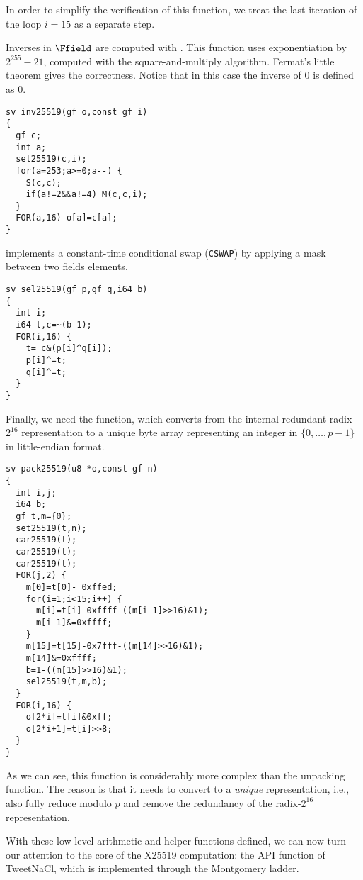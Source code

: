 In order to simplify the verification of this function,
we treat the last iteration of the loop $i = 15$ as a separate step.

Inverses in $\Ffield$ are computed with .
This function uses exponentiation by $2^{255}-21$,
computed with the square-and-multiply algorithm.
Fermat's little theorem gives the correctness.
Notice that in this case the inverse of $0$ is defined as $0$.
\begin{lstlisting}[language=Ctweetnacl]
sv inv25519(gf o,const gf i)
{
  gf c;
  int a;
  set25519(c,i);
  for(a=253;a>=0;a--) {
    S(c,c);
    if(a!=2&&a!=4) M(c,c,i);
  }
  FOR(a,16) o[a]=c[a];
}
\end{lstlisting}

 implements a constant-time conditional swap (\texttt{CSWAP}) by
applying a mask between two fields elements.
\begin{lstlisting}[language=Ctweetnacl]
sv sel25519(gf p,gf q,i64 b)
{
  int i;
  i64 t,c=~(b-1);
  FOR(i,16) {
    t= c&(p[i]^q[i]);
    p[i]^=t;
    q[i]^=t;
  }
}
\end{lstlisting}

Finally, we need the  function,
which converts from the internal redundant radix-$2^{16}$
representation to a unique byte array representing an
integer in $\{0,\dots,p-1\}$ in little-endian format.
\begin{lstlisting}[language=Ctweetnacl]
sv pack25519(u8 *o,const gf n)
{
  int i,j;
  i64 b;
  gf t,m={0};
  set25519(t,n);
  car25519(t);
  car25519(t);
  car25519(t);
  FOR(j,2) {
    m[0]=t[0]- 0xffed;
    for(i=1;i<15;i++) {
      m[i]=t[i]-0xffff-((m[i-1]>>16)&1);
      m[i-1]&=0xffff;
    }
    m[15]=t[15]-0x7fff-((m[14]>>16)&1);
    m[14]&=0xffff;
    b=1-((m[15]>>16)&1);
    sel25519(t,m,b);
  }
  FOR(i,16) {
    o[2*i]=t[i]&0xff;
    o[2*i+1]=t[i]>>8;
  }
}
\end{lstlisting}
As we can see, this function is considerably more complex than the
unpacking function. The reason is that it needs to convert
to a \emph{unique} representation, i.e., also fully reduce modulo
$p$ and remove the redundancy of the radix-$2^{16}$ representation.

With these low-level arithmetic and helper functions defined,
we can now turn our attention to the core of the X25519 computation:
the  API function of TweetNaCl,
which is implemented through the Montgomery ladder.


